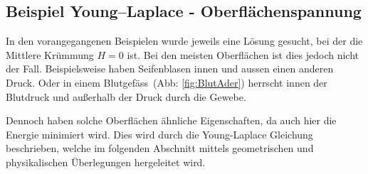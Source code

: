 \begin{refsection}
\subsection{Beispiel Young–Laplace - Oberflächenspannung}
\label{Young-Laplace}

\label{YL-Beschreibung}
In den vorangegangenen Beispielen wurde jeweils eine Lösung gesucht, bei der die Mittlere Krümmung $H=0$ ist. Bei den meisten Oberflächen ist dies jedoch nicht der Fall. Beispielsweise haben Seifenblasen innen und aussen einen anderen Druck. Oder in einem Blutgefäss \,(Abb: \ref{fig:BlutAder}) herrscht innen der Blutdruck und außerhalb der Druck durch die Gewebe.

Dennoch haben solche Oberflächen ähnliche Eigenschaften, da auch hier die Energie minimiert wird. Dies wird durch die Young-Laplace Gleichung \cite{minimal:Laplace} beschrieben, welche im folgenden Abschnitt mittels geometrischen und physikalischen Überlegungen hergeleitet wird.

\end{refsection}
